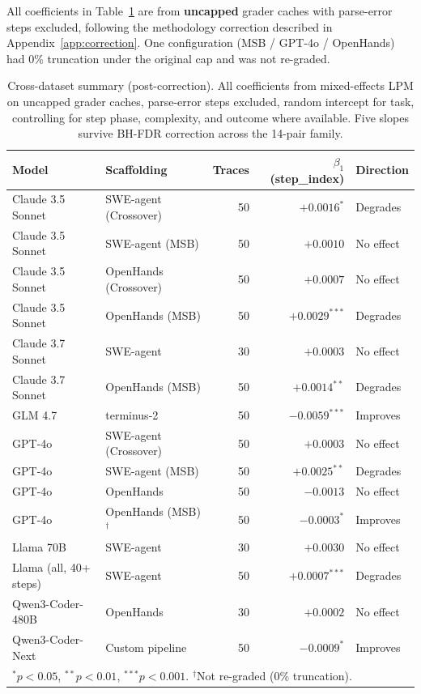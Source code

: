 \documentclass[11pt]{article}
\begin{document}
All coefficients in Table~\ref{tab:configs} are from \textbf{uncapped} grader caches with parse-error steps excluded, following the methodology correction described in Appendix~\ref{app:correction}.
One configuration (MSB / GPT-4o / OpenHands) had 0\% truncation under the original cap and was not re-graded.

\begin{table}[h]
\centering
\small
\caption{Cross-dataset summary (post-correction). All coefficients from mixed-effects LPM on uncapped grader caches, parse-error steps excluded, random intercept for task, controlling for step phase, complexity, and outcome where available. Five slopes survive BH-FDR correction across the 14-pair family.}
\label{tab:configs}
\begin{tabular}{llrrl}
\toprule
Model & Scaffolding & Traces & $\beta_1$ (step\_index) & Direction \\
\midrule
Claude 3.5 Sonnet & SWE-agent (Crossover) & 50 & $+0.0016^{*}$ & Degrades \\
Claude 3.5 Sonnet & SWE-agent (MSB) & 50 & $+0.0010$ & No effect \\
Claude 3.5 Sonnet & OpenHands (Crossover) & 50 & $+0.0007$ & No effect \\
Claude 3.5 Sonnet & OpenHands (MSB) & 50 & $+0.0029^{***}$ & Degrades \\
Claude 3.7 Sonnet & SWE-agent & 30 & $+0.0003$ & No effect \\
Claude 3.7 Sonnet & OpenHands (MSB) & 50 & $+0.0014^{**}$ & Degrades \\
GLM 4.7 & terminus-2 & 50 & $-0.0059^{***}$ & Improves \\
GPT-4o & SWE-agent (Crossover) & 50 & $+0.0003$ & No effect \\
GPT-4o & SWE-agent (MSB) & 50 & $+0.0025^{**}$ & Degrades \\
GPT-4o & OpenHands & 50 & $-0.0013$ & No effect \\
GPT-4o & OpenHands (MSB)$^\dagger$ & 50 & $-0.0003^{*}$ & Improves \\
Llama 70B & SWE-agent & 30 & $+0.0030$ & No effect \\
Llama (all, 40+ steps) & SWE-agent & 50 & $+0.0007^{***}$ & Degrades \\
Qwen3-Coder-480B & OpenHands & 30 & $+0.0002$ & No effect \\
Qwen3-Coder-Next & Custom pipeline & 50 & $-0.0009^{*}$ & Improves \\
\bottomrule
\multicolumn{5}{l}{\footnotesize $^{*}p < 0.05$, $^{**}p < 0.01$, $^{***}p < 0.001$. $^\dagger$Not re-graded (0\% truncation).}
\end{tabular}
\end{table}
\end{document}

